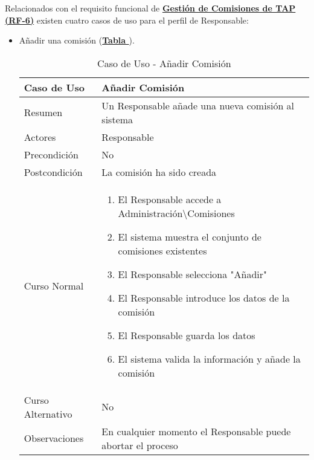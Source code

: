 Relacionados con el requisito funcional de \textbf{\hyperref[tab:rfGestComTAP]{Gestión de Comisiones de TAP (RF-6)}} existen cuatro casos de uso para el perfil de Responsable:
\begin{itemize}
	\item \addtocounter{tabla}{1} Añadir una comisión (\textbf{\hyperref[tab:curCrearComision]{Tabla }}).
		\begin{table}[!htbp]
		  \centering  \addtocounter{casouso}{1}
		  \begin{tabular}{|l | p{100mm}|}
		    \textbf{Caso de Uso}  & \textbf{Añadir Comisión} \\ \hline
		    Resumen 		 & Un Responsable añade una nueva comisión al sistema \\ \hline
		    Actores  		 & Responsable \\ \hline
		    Precondición  	 & No \\ \hline
		    Postcondición  	 & La comisión ha sido creada \\ \hline
		    Curso Normal   	 & \begin{enumerate}
			  \item El Responsable accede a Administración\textbackslash Comisiones
			  \item El sistema muestra el conjunto de comisiones existentes
			  \item El Responsable selecciona "Añadir"
			  \item El Responsable introduce los datos de la comisión
			  \item El Responsable guarda los datos
			  \item El sistema valida la información y añade la comisión
		    \end{enumerate}  \\ \hline
		    Curso Alternativo  & No  \\ \hline
		    Observaciones 	 & En cualquier momento el Responsable puede abortar el proceso  \\ \hline
		  \end{tabular}
		  \caption{Caso de Uso  - Añadir Comisión}
		  \label{tab:curCrearComision}
		\end{table}
		\FloatBarrier
		

\end{itemize}
